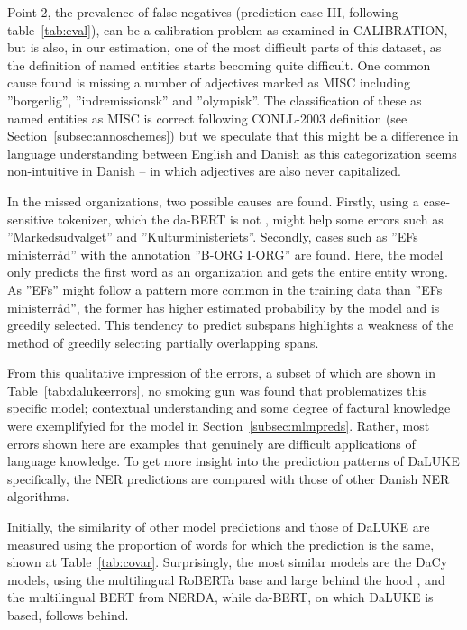 \documentclass[main.tex]{subfiles}
\begin{document}
Point 2, the prevalence of false negatives (prediction case III, following table~\ref{tab:eval}), can be a calibration problem as examined in CALIBRATION, but is also, in our estimation, one of the most difficult parts of this dataset, as the definition of named entities starts becoming quite difficult.
One common cause found is missing a number of adjectives marked as MISC including ''borgerlig'', ''indremissionsk'' and ''olympisk''.
The classification of these as named entities as MISC is correct following CONLL-2003 definition (see Section~\ref{subsec:annoschemes}) but we speculate that this might be a difference in language understanding between English and Danish as this categorization seems non-intuitive in Danish -- in which adjectives are also never capitalized.

In the missed organizations, two possible causes are found.
Firstly, using a case-sensitive tokenizer, which the da-BERT is not \cite{botxo2019dabert}, might help some errors such as ''Markedsudvalget'' and ''Kulturministeriets''.
Secondly, cases such as ''EFs ministerråd'' with the annotation ''B-ORG I-ORG'' are found.
Here, the model only predicts the first word as an organization and gets the entire entity wrong.
As ''EFs'' might follow a pattern more common in the training data than ''EFs ministerråd'', the former has higher estimated probability by the model and is greedily selected.
This tendency to predict subspans highlights a weakness of the method of greedily selecting partially overlapping spans.

From this qualitative impression of the errors, a subset of which are shown in Table~\ref{tab:dalukeerrors}, no smoking gun was found that problematizes this specific model;
contextual understanding and some degree of factural knowledge were exemplifyied for the model in Section~\ref{subsec:mlmpreds}.
Rather, most errors shown here are examples that genuinely are difficult applications of language knowledge.
To get more insight into the prediction patterns of DaLUKE specifically, the NER predictions are compared with those of other Danish NER algorithms.

Initially, the similarity of other model predictions and those of DaLUKE are measured using the proportion of words for which the prediction is the same, shown at Table~\ref{tab:covar}.
Surprisingly, the most similar models are the DaCy models, using the multilingual RoBERTa base and large behind the hood \cite{enevoldsen2020dacy}, and the multilingual BERT from NERDA, while da-BERT, on which DaLUKE is based, follows behind.
\end{document}
